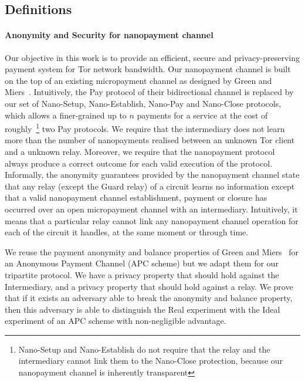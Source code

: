 
\subsection{Definitions}

\paragraph*{Anonymity and Security for nanopayment channel}

Our objective in this work is to provide an efficient, secure and privacy-preserving payment system for Tor network bandwidth. Our nanopayment channel is built on the top of an existing micropayment channel as designed by Green and Miers~\cite{}. Intuitively, the Pay protocol of their bidirectional channel is replaced by our set of Nano-Setup, Nano-Establish, Nano-Pay and Nano-Close protocols, which allows a finer-grained up to $n$ payments for a service at the cost of roughly~\footnote{Nano-Setup and Nano-Establish do not require that the relay and the intermediary cannot link them to the Nano-Close protection, because our nanopayment channel is inherently transparent} two Pay protocols.
We require that the intermediary does not learn more than the number of nanopayments realised between an unknown Tor client and a unknown relay. Moreover, we require that the nanopayment protocol always produce a correct outcome for each valid execution of the protocol.
Informally, the anonymity guarantees provided by the nanopayment channel state that any relay (except the Guard relay) of a circuit learns no information except that a valid nanopayment channel establishment, payment or closure has occurred over an open micropayment channel with an intermediary. Intuitively, it means that a particular relay cannot link any nanopayment channel operation for each of the circuit it handles, at the same moment or through time.

We reuse the payment anonymity and balance properties of Green and Miers~\cite{bolt-eprint} for an Anonymous Payment Channel (APC scheme) but we adapt them for our tripartite protocol. We have a privacy property that should hold against the Intermediary, and a privacy property that should hold against a relay.
We prove that if it exists an adversary able to break the anonymity and balance property, then this adversary is able to distinguish the Real experiment with the Ideal experiment of an APC scheme with non-negligible advantage.

